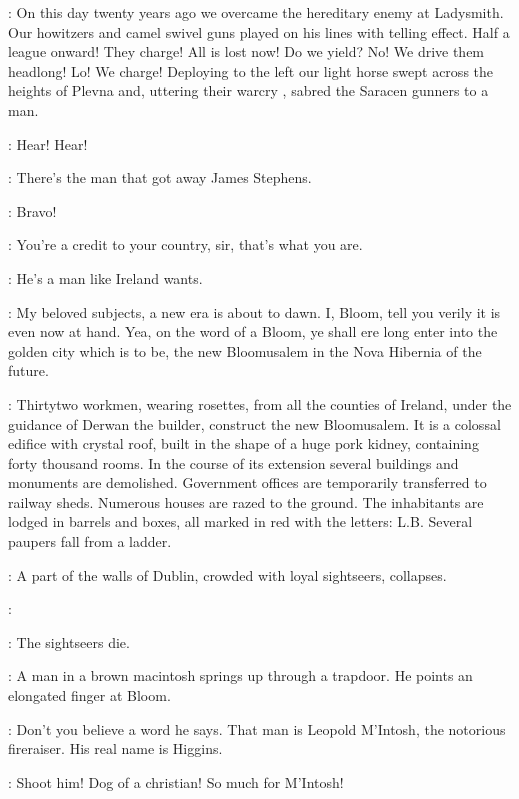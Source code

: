 \Bloom:
On this day twenty years ago we overcame the hereditary enemy at Ladysmith.
Our howitzers and camel swivel guns played on his lines with telling effect.
Half a league onward!
They charge!
All is lost now!
Do we yield?
No!
We drive them headlong!
Lo!
We charge!
Deploying to the left our light horse swept across the heights of Plevna
and,
uttering their warcry ,
sabred the Saracen gunners to a man.

\Typesetters[1]:
Hear!
Hear!

\JohnWyse[2]:
There's the man that got away James Stephens.

\Bluecoat[1]:
Bravo!

\OldResident[2]:
You're a credit to your country,
sir,
that's what you are.

\AppleWoman[1]:
He's a man like Ireland wants.

\Bloom:
My beloved subjects,
a new era is about to dawn.
I,
Bloom,
tell you verily it is even now at hand.
Yea,
on the word of a Bloom,
ye shall ere long
enter into the golden city which is to be,
the new Bloomusalem
in the Nova Hibernia of the future.

:
Thirtytwo workmen,
wearing rosettes,
from all the counties of Ireland,
under the guidance of Derwan the builder,
construct the new Bloomusalem.
It is a colossal edifice with crystal roof,
built in the shape of a huge pork kidney,
containing forty thousand rooms.
In the course of its extension
several buildings and monuments are demolished.
Government offices are temporarily transferred to railway sheds.
Numerous houses are razed to the ground.
The inhabitants are lodged in barrels and boxes,
all marked in red with the letters:
L.B.
Several paupers fall from a ladder.

:
A part of the walls of Dublin,
crowded with loyal sightseers,
collapses.

\Sightseers:


:
The sightseers die.

:
A man in a brown macintosh springs up through a trapdoor.
He points an elongated finger at Bloom.

\Macintosh:
Don't you believe a word he says.
That man is Leopold M'Intosh,
the notorious fireraiser.
His real name is Higgins.

\Bloom:
Shoot him!
Dog of a christian!
So much for M'Intosh!

